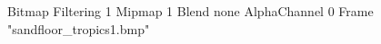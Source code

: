 {Bitmap
	{Filtering 1}
	{Mipmap 1}
	{Blend none}
	{AlphaChannel 0}
	{Frame "sandfloor_tropics1.bmp"}
}
